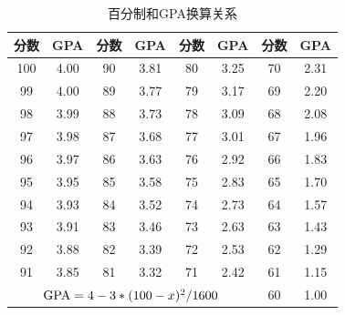 \documentclass[UTF8,12pt,a4paper]{ctexart}
\begin{document}
\begin{table}[h]
	\renewcommand\arraystretch{1.2}
	\centering
	\begin{tabular}{@{}cccccccc@{}}
		\toprule
		\textbf{分数}                                       & \textbf{GPA} & \textbf{分数} & \textbf{GPA} & \textbf{分数} & \textbf{GPA} & \textbf{分数} & \textbf{GPA} \\ \midrule
		100                                                 & 4.00         & 90            & 3.81         & 80            & 3.25         & 70            & 2.31         \\
		99                                                  & 4.00         & 89            & 3.77         & 79            & 3.17         & 69            & 2.20         \\
		98                                                  & 3.99         & 88            & 3.73         & 78            & 3.09         & 68            & 2.08         \\
		97                                                  & 3.98         & 87            & 3.68         & 77            & 3.01         & 67            & 1.96         \\
		96                                                  & 3.97         & 86            & 3.63         & 76            & 2.92         & 66            & 1.83         \\
		95                                                  & 3.95         & 85            & 3.58         & 75            & 2.83         & 65            & 1.70         \\
		94                                                  & 3.93         & 84            & 3.52         & 74            & 2.73         & 64            & 1.57         \\
		93                                                  & 3.91         & 83            & 3.46         & 73            & 2.63         & 63            & 1.43         \\
		92                                                  & 3.88         & 82            & 3.39         & 72            & 2.53         & 62            & 1.29         \\
		91                                                  & 3.85         & 81            & 3.32         & 71            & 2.42         & 61            & 1.15         \\
		\multicolumn{6}{c}{${\rm GPA}= 4-3*(100-x)^2/1600$} & 60           & 1.00                                                                                       \\ \bottomrule
	\end{tabular}
	\caption{百分制和GPA换算关系}
	\label{tab:my-table2}
\end{table}
\end{document}
